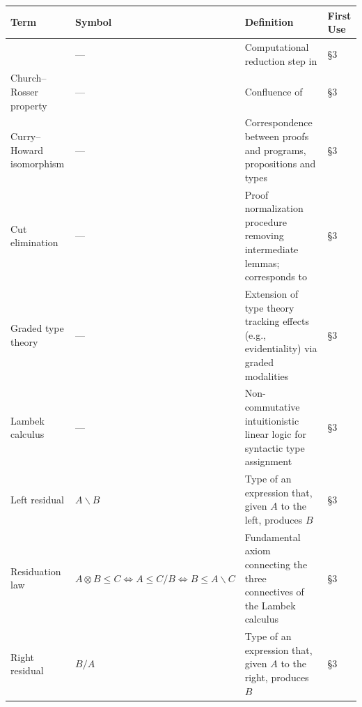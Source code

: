 \documentclass[
]{article}
\newcounter{none} %
\numberwithin{equation}{section}
\begin{document}
{\def\LTcaptype{none} %
\begin{longtable}[]{@{}
  >{\raggedright\arraybackslash}p{}
  >{\centering\arraybackslash}p{}
  >{\raggedright\arraybackslash}p{}
  >{\centering\arraybackslash}p{}@{}}
\toprule\noalign{}
\begin{minipage}[b]{\linewidth}\raggedright
Term
\end{minipage} & \begin{minipage}[b]{\linewidth}\centering
Symbol
\end{minipage} & \begin{minipage}[b]{\linewidth}\raggedright
Definition
\end{minipage} & \begin{minipage}[b]{\linewidth}\centering
First Use
\end{minipage} \\
\midrule\noalign{}
\endhead
\bottomrule\noalign{}
\endlastfoot
\(\beta)-reduction & --- & Computational reduction step in
\(\lambda)-calculus; corresponds to cut elimination in proofs & §3 \\
Church--Rosser property & --- & Confluence of \(\beta)-reduction: all
reduction sequences converge to the same normal form & §3 \\
Curry--Howard isomorphism & --- & Correspondence between proofs and
programs, propositions and types & §3 \\
Cut elimination & --- & Proof normalization procedure removing
intermediate lemmas; corresponds to \(\beta)-reduction & §3 \\
Graded type theory & --- & Extension of type theory tracking effects
(e.g., evidentiality) via graded modalities & §3 \\
Lambek calculus & --- & Non-commutative intuitionistic linear logic for
syntactic type assignment & §3 \\
Left residual & \(A \backslash B\) & Type of an expression that, given
\(A\) to the left, produces \(B\) & §3 \\
Residuation law &
\(A \otimes B \leq C \iff A \leq C / B \iff B \leq A \backslash C\) &
Fundamental axiom connecting the three connectives of the Lambek
calculus & §3 \\
Right residual & \(B / A\) & Type of an expression that, given \(A\) to
the right, produces \(B\) & §3 \\
\end{longtable}
}
\end{document}

